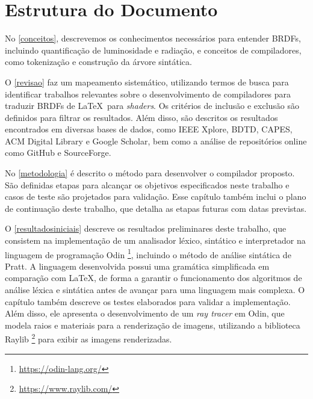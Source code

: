 \documentclass[english, 
               brazil, 
               bsc] %
               {dcomp-abntex2}
\begin{document}
\section{Estrutura do Documento}
No \autoref{conceitos}, descrevemos os conhecimentos necessários para entender BRDFs, incluindo quantificação de luminosidade e radiação, e  conceitos de compiladores, como tokenização e construção da árvore sintática.


O \autoref{revisao} faz um mapeamento sistemático, utilizando termos de busca para identificar trabalhos relevantes sobre o desenvolvimento de compiladores para traduzir BRDFs de \LaTeX\  para \textit{shaders}. Os critérios de inclusão e exclusão são definidos para filtrar os resultados. Além disso, são descritos os resultados encontrados em diversas bases de dados, como IEEE Xplore, BDTD, CAPES, ACM Digital Library e Google Scholar, bem como a análise de repositórios online como GitHub e SourceForge. 


No \autoref{metodologia} é descrito o método para desenvolver o compilador proposto. São definidas etapas para alcançar os objetivos especificados neste trabalho e casos de teste são projetados para validação. Esse capítulo também inclui o plano de continuação deste trabalho, que detalha as etapas futuras com datas previstas.




O \autoref{resultadosiniciais} descreve os resultados preliminares deste trabalho, que consistem na implementação de um analisador léxico, sintático e interpretador na linguagem de programação Odin \footnote{\url{https://odin-lang.org/}}, incluindo o método de análise sintática de Pratt. A linguagem desenvolvida possui uma gramática simplificada em comparação com \LaTeX, de forma a garantir o funcionamento dos algoritmos de análise léxica e sintática antes de avançar para uma linguagem mais complexa. O capítulo também descreve os testes elaborados para validar a implementação. Além disso, ele apresenta o desenvolvimento de um \textit{ray tracer} em Odin, que modela raios e materiais para a renderização de imagens, utilizando a biblioteca Raylib \footnote{\url{https://www.raylib.com/}} para exibir as imagens renderizadas.













\end{document}
